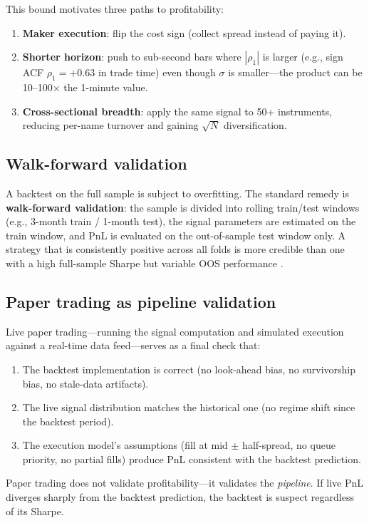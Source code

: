 \documentclass[11pt,a4paper]{article}
\begin{document}
This bound motivates three paths to profitability:
\begin{enumerate}[leftmargin=1.5em]
  \item \textbf{Maker execution}: flip the cost sign (collect spread
        instead of paying it).
  \item \textbf{Shorter horizon}: push to sub-second bars where
        $|\rho_1|$ is larger (e.g., sign ACF $\rho_1 = +0.63$ in
        trade time) even though $\sigma$ is smaller---the product
        can be 10--100$\times$ the 1-minute value.
  \item \textbf{Cross-sectional breadth}: apply the same signal to
        50+ instruments, reducing per-name turnover and gaining
        $\sqrt{N}$ diversification.
\end{enumerate}

\subsection{Walk-forward validation}

A backtest on the full sample is subject to overfitting. The standard
remedy is \textbf{walk-forward validation}: the sample is divided into
rolling train/test windows (e.g., 3-month train / 1-month test), the
signal parameters are estimated on the train window, and PnL is
evaluated on the out-of-sample test window only. A strategy that is
consistently positive across all folds is more credible than one with a
high full-sample Sharpe but variable OOS performance
\citep{bailey2014probability}.

\subsection{Paper trading as pipeline validation}

Live paper trading---running the signal computation and simulated
execution against a real-time data feed---serves as a final check that:
\begin{enumerate}[leftmargin=1.5em]
  \item The backtest implementation is correct (no look-ahead bias,
        no survivorship bias, no stale-data artifacts).
  \item The live signal distribution matches the historical one
        (no regime shift since the backtest period).
  \item The execution model's assumptions (fill at mid $\pm$
        half-spread, no queue priority, no partial fills) produce
        PnL consistent with the backtest prediction.
\end{enumerate}
Paper trading does not validate profitability---it validates the
\emph{pipeline}. If live PnL diverges sharply from the backtest
prediction, the backtest is suspect regardless of its Sharpe.
\end{document}
